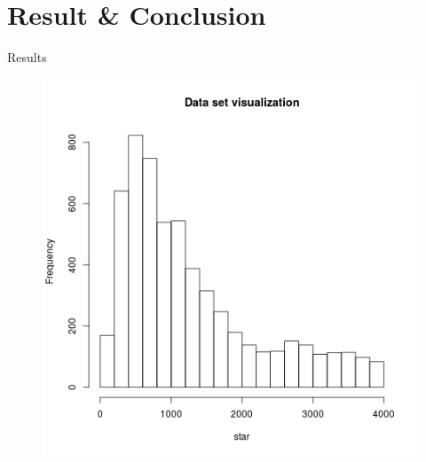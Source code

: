 \documentclass[presentation]{beamer}
\begin{document}
\section{Result \& Conclusion}
\begin{frame}{Results}
  
  \begin{figure}[ht]
    \centering
    \includegraphics[height=0.8\textheight]{star-hist.png}
  \end{figure}

\end{frame}
\end{document}
